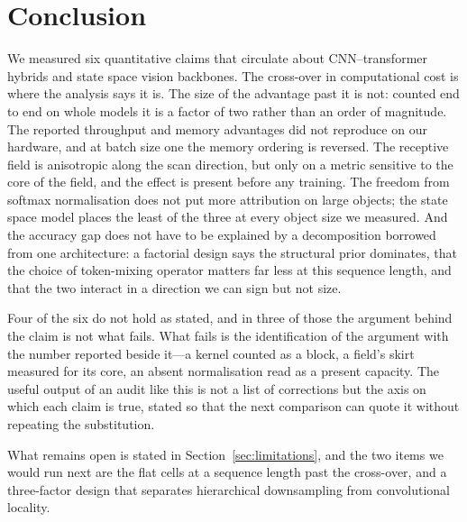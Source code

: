 \section{Conclusion}
\label{sec:conclusion}

We measured six quantitative claims that circulate about CNN--transformer
hybrids and state space vision backbones. The cross-over in computational
cost is where the analysis says it is. The size of the advantage past it is
not: counted end to end on whole models it is a factor of two rather than an
order of magnitude. The reported throughput and memory advantages did not
reproduce on our hardware, and at batch size one the memory ordering is
reversed. The receptive field is anisotropic along the scan direction, but
only on a metric sensitive to the core of the field, and the effect is
present before any training. The freedom from softmax normalisation does not
put more attribution on large objects; the state space model places the least
of the three at every object size we measured. And the accuracy gap does not
have to be explained by a decomposition borrowed from one architecture: a
factorial design says the structural prior dominates, that the choice of
token-mixing operator matters far less at this sequence length, and that the
two interact in a direction we can sign but not size.

Four of the six do not hold as stated, and in three of those the argument
behind the claim is not what fails. What fails is the identification of the
argument with the number reported beside it---a kernel counted as a block, a
field's skirt measured for its core, an absent normalisation read as a
present capacity. The useful output of an audit like this is not a list of
corrections but the axis on which each claim is true, stated so that the next
comparison can quote it without repeating the substitution.

What remains open is stated in Section~\ref{sec:limitations}, and the two
items we would run next are the flat cells at a sequence length past the
cross-over, and a three-factor design that separates hierarchical
downsampling from convolutional locality.
